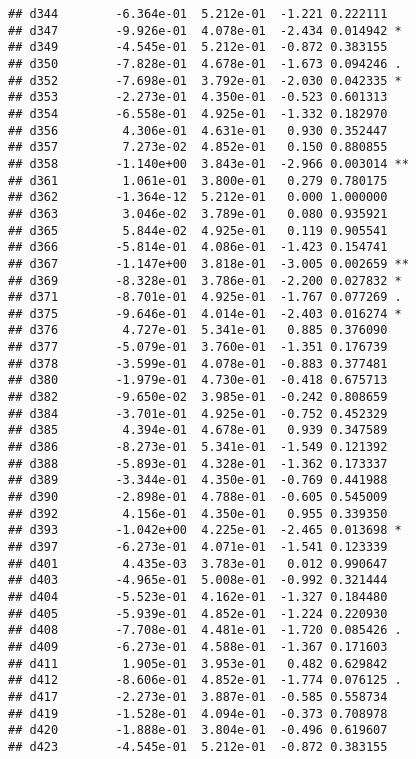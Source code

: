 \documentclass[
]{article}
\begin{document}
\begin{verbatim}
## d344        -6.364e-01  5.212e-01  -1.221 0.222111    
## d347        -9.926e-01  4.078e-01  -2.434 0.014942 *  
## d349        -4.545e-01  5.212e-01  -0.872 0.383155    
## d350        -7.828e-01  4.678e-01  -1.673 0.094246 .  
## d352        -7.698e-01  3.792e-01  -2.030 0.042335 *  
## d353        -2.273e-01  4.350e-01  -0.523 0.601313    
## d354        -6.558e-01  4.925e-01  -1.332 0.182970    
## d356         4.306e-01  4.631e-01   0.930 0.352447    
## d357         7.273e-02  4.852e-01   0.150 0.880855    
## d358        -1.140e+00  3.843e-01  -2.966 0.003014 ** 
## d361         1.061e-01  3.800e-01   0.279 0.780175    
## d362        -1.364e-12  5.212e-01   0.000 1.000000    
## d363         3.046e-02  3.789e-01   0.080 0.935921    
## d365         5.844e-02  4.925e-01   0.119 0.905541    
## d366        -5.814e-01  4.086e-01  -1.423 0.154741    
## d367        -1.147e+00  3.818e-01  -3.005 0.002659 ** 
## d369        -8.328e-01  3.786e-01  -2.200 0.027832 *  
## d371        -8.701e-01  4.925e-01  -1.767 0.077269 .  
## d375        -9.646e-01  4.014e-01  -2.403 0.016274 *  
## d376         4.727e-01  5.341e-01   0.885 0.376090    
## d377        -5.079e-01  3.760e-01  -1.351 0.176739    
## d378        -3.599e-01  4.078e-01  -0.883 0.377481    
## d380        -1.979e-01  4.730e-01  -0.418 0.675713    
## d382        -9.650e-02  3.985e-01  -0.242 0.808659    
## d384        -3.701e-01  4.925e-01  -0.752 0.452329    
## d385         4.394e-01  4.678e-01   0.939 0.347589    
## d386        -8.273e-01  5.341e-01  -1.549 0.121392    
## d388        -5.893e-01  4.328e-01  -1.362 0.173337    
## d389        -3.344e-01  4.350e-01  -0.769 0.441988    
## d390        -2.898e-01  4.788e-01  -0.605 0.545009    
## d392         4.156e-01  4.350e-01   0.955 0.339350    
## d393        -1.042e+00  4.225e-01  -2.465 0.013698 *  
## d397        -6.273e-01  4.071e-01  -1.541 0.123339    
## d401         4.435e-03  3.783e-01   0.012 0.990647    
## d403        -4.965e-01  5.008e-01  -0.992 0.321444    
## d404        -5.523e-01  4.162e-01  -1.327 0.184480    
## d405        -5.939e-01  4.852e-01  -1.224 0.220930    
## d408        -7.708e-01  4.481e-01  -1.720 0.085426 .  
## d409        -6.273e-01  4.588e-01  -1.367 0.171603    
## d411         1.905e-01  3.953e-01   0.482 0.629842    
## d412        -8.606e-01  4.852e-01  -1.774 0.076125 .  
## d417        -2.273e-01  3.887e-01  -0.585 0.558734    
## d419        -1.528e-01  4.094e-01  -0.373 0.708978    
## d420        -1.888e-01  3.804e-01  -0.496 0.619607    
## d423        -4.545e-01  5.212e-01  -0.872 0.383155    

\end{verbatim}
\end{document}
